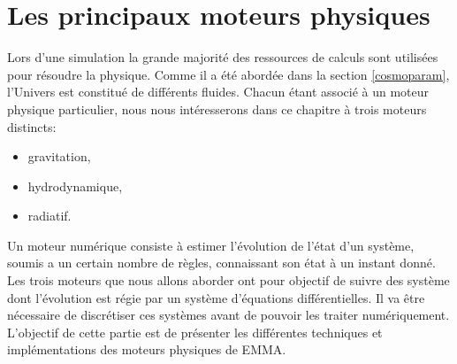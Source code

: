 \chapter{Les principaux moteurs physiques}
\label{sec:solvers}


Lors d'une simulation la grande majorité des ressources de calculs sont utilisées pour résoudre la physique.
Comme il a été abordée dans la section \ref{cosmoparam}, l'Univers est constitué de différents fluides.
Chacun étant associé à un moteur physique particulier, nous nous intéresserons dans ce chapitre à trois moteurs distincts:
\begin{itemize}
\item gravitation,
\item hydrodynamique,
\item radiatif.
\end{itemize}



Un moteur numérique consiste à estimer l'évolution de l'état d'un système, soumis a un certain nombre de règles, connaissant son état à un instant donné.
Les trois moteurs que nous allons aborder ont pour objectif de suivre des système dont l'évolution est régie par un système d'équations différentielles.
Il va être nécessaire de discrétiser ces systèmes avant de pouvoir les traiter numériquement.
L'objectif de cette partie est de présenter les différentes techniques et implémentations des moteurs physiques de EMMA.


